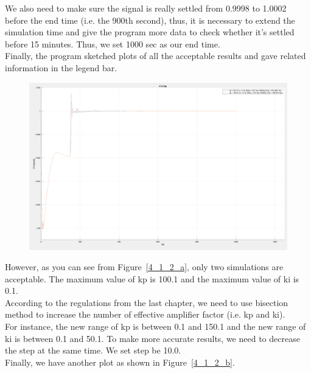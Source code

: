We also need to make sure the signal is really settled from 0.9998 to 1.0002 before the end time (i.e. the 900th second), thus, it is necessary to extend the simulation time and give the program more data to check whether it's settled before 15 minutes. Thus, we set 1000 sec as our end time.\\

Finally, the program sketched plots of all the acceptable results and gave related information in the legend bar.\\

\begin{figure}[htbp]
\centering
\includegraphics[width = .819\textwidth]{figure/4_1_2_a.png}
\end{figure}

However, as you can see from Figure~\ref{4_1_2_a}, only two simulations are acceptable. The maximum value of kp is 100.1 and the maximum value of ki is 0.1.  \\

According to the regulations from the last chapter, we need to use bisection method to increase the number of effective amplifier factor (i.e. kp and ki).\\

For instance, the new range of kp is between 0.1 and 150.1 and the new range of ki is between 0.1 and 50.1. To make more accurate results, we need to decrease the step at the same time. We set step be 10.0. \\ 

Finally, we have another plot as shown in Figure~\ref{4_1_2_b}. \\

